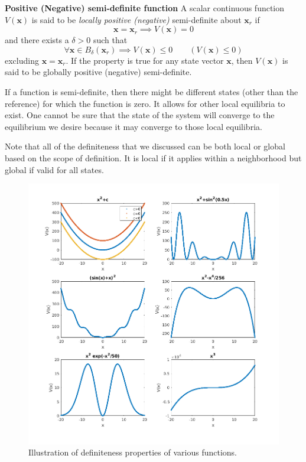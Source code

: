 \documentclass{article}
\begin{document}
\textbf{Positive (Negative) semi-definite function} A scalar continuous function $V(\bm{x})$ is said to be \textit{locally positive (negative)} semi-definite about $\bm{x}_{r}$ if
$$
\bm{x}=\bm{x}_{r}\implies V(\bm{x})=0
$$
and there exists a $\delta>0$ such that
$$
\forall\bm{x}\in B_{\delta}(\bm{x}_{r})\implies V(\bm{x})\leq0\quad\quad (V(\bm{x})\leq 0)
$$
excluding $\bm{x}=\bm{x}_{r}$. If the property is true for any state vector $\bm{x}$, then $V(\bm{x})$ is said to be globally positive (negative) semi-definite.

If a function is semi-definite, then there might be different states (other than the reference) for which the function is zero. It allows for other local equilibria to exist. One cannot be sure that the state of the system will converge to the equilibrium we desire because it may converge to those local equilibria.

Note that all of the definiteness that we discussed can be both local or global based on the scope of definition. It is local if it applies within a neighborhood but global if valid for all states.

\begin{figure}[ht]
  \label{fig_definite_functions}
  \centering
  \includegraphics[scale=0.5, angle=0]{figs/fig_definite_functions.png}
  \caption{Illustration of definiteness properties of various functions.}
\end{figure}
\end{document}
